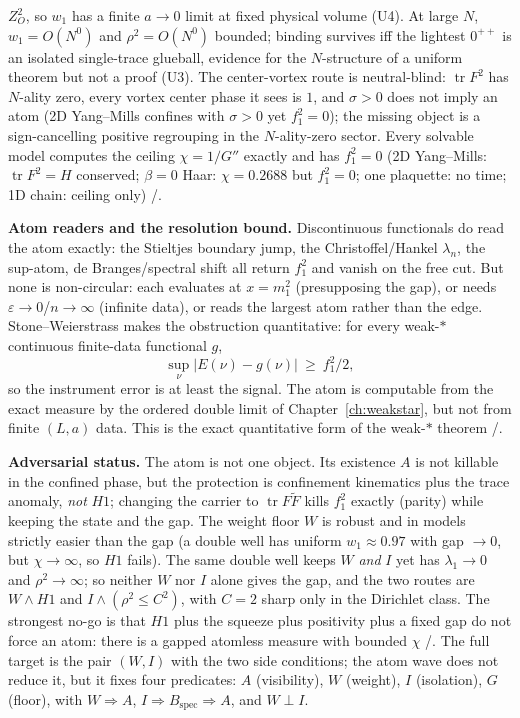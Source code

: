 $Z_O^2$, so $w_1$ has a finite $a\to0$ limit at fixed physical volume (U4). At large $N$,
$w_1=O(N^0)$ and $\rho^2=O(N^0)$ bounded; binding survives iff the lightest $0^{++}$ is an isolated
single-trace glueball, evidence for the $N$-structure of a uniform theorem but not a proof (U3). The
center-vortex route is neutral-blind: $\operatorname{tr}F^2$ has
$N$-ality zero, every vortex center phase it sees is $1$, and $\sigma>0$ does not imply an atom (2D
Yang--Mills confines with $\sigma>0$ yet $f_1^2=0$); the missing object is a sign-cancelling positive
regrouping in the $N$-ality-zero sector. Every solvable model computes the ceiling $\chi=1/G''$
exactly and has $f_1^2=0$ (2D Yang--Mills: $\operatorname{tr}F^2=H$ conserved; $\beta=0$ Haar:
$\chi=0.2688$ but $f_1^2=0$; one plaquette: no time; 1D chain: ceiling only) \LT/\LE.

\textbf{Atom readers and the resolution bound.} Discontinuous functionals do read the atom exactly:
the Stieltjes boundary jump, the Christoffel/Hankel $\lambda_n$, the sup-atom, de Branges/spectral
shift all return $f_1^2$ and vanish on the free cut. But none is non-circular: each evaluates at
$x=m_1^2$ (presupposing the gap), or needs $\varepsilon\to0$/$n\to\infty$ (infinite data), or reads
the largest atom rather than the edge. Stone--Weierstrass makes the obstruction quantitative: for
every weak-$*$ continuous finite-data functional $g$,
\begin{equation}
  \sup_\nu|E(\nu)-g(\nu)|\ \ge\ f_1^2/2 ,
  \label{eq:v3resolutionbound}
\end{equation}
so the instrument error is at least the signal. The atom is computable from the exact measure by the
ordered double limit of Chapter~\ref{ch:weakstar}, but not from finite $(L,a)$ data. This is the
exact quantitative form of the weak-$*$ theorem \LT/\LN.

\textbf{Adversarial status.} The atom is not one object. Its existence $A$ is not killable in the
confined phase, but the protection is confinement kinematics plus the trace anomaly, \emph{not}
$H1$; changing the carrier to $\operatorname{tr}F\tilde F$ kills $f_1^2$ exactly (parity) while
keeping the state and the gap. The weight floor $W$ is robust and in models strictly easier than
the gap (a double well has uniform $w_1\approx0.97$ with gap $\to0$, but $\chi\to\infty$, so $H1$
fails). The same double well keeps $W$ \emph{and} $I$ yet has $\lambda_1\to0$ and
$\rho^2\to\infty$; so neither $W$ nor $I$ alone gives the gap, and the two routes are
$W\wedge H1$ and $I\wedge(\rho^2\le C^2)$, with $C=2$ sharp only in the Dirichlet class. The strongest
no-go is that $H1$ plus the squeeze plus positivity plus a fixed gap do not force an atom: there is a
gapped atomless measure with bounded $\chi$ \LT/\LN. The full target is the pair $(W,I)$ with the two
side conditions; the atom wave does not reduce it, but it fixes four predicates: $A$ (visibility),
$W$ (weight), $I$ (isolation), $G$ (floor), with $W\Rightarrow A$,
$I\Rightarrow B_{\mathrm{spec}}\Rightarrow A$, and $W\perp I$.

